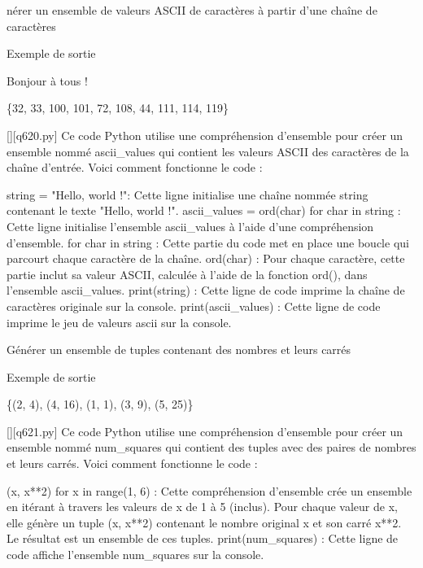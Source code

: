         \question
        nérer un ensemble de valeurs ASCII de caractères à partir d'une chaîne de caractères

Exemple de sortie

Bonjour à tous !

\{32, 33, 100, 101, 72, 108, 44, 111, 114, 119\}
        \par
        \begin{solution}
            \renewcommand{\nomfichier}{q620.py}
            \pythonfile{\chemincode \nomfichier}[][\nomfichier]
            Ce code Python utilise une compréhension d'ensemble pour créer un ensemble nommé ascii_values qui contient les valeurs ASCII des caractères de la chaîne d'entrée. Voici comment fonctionne le code :

    string = "Hello, world !": Cette ligne initialise une chaîne nommée string contenant le texte "Hello, world !".
    ascii_values = {ord(char) for char in string} : Cette ligne initialise l'ensemble ascii_values à l'aide d'une compréhension d'ensemble.
        for char in string : Cette partie du code met en place une boucle qui parcourt chaque caractère de la chaîne.
        {ord(char)} : Pour chaque caractère, cette partie inclut sa valeur ASCII, calculée à l'aide de la fonction ord(), dans l'ensemble ascii_values.
    print(string) : Cette ligne de code imprime la chaîne de caractères originale sur la console.
    print(ascii_values) : Cette ligne de code imprime le jeu de valeurs ascii sur la console.
        \end{solution}
        

        \question
        Générer un ensemble de tuples contenant des nombres et leurs carrés

Exemple de sortie

\{(2, 4), (4, 16), (1, 1), (3, 9), (5, 25)\}
        \par
        \begin{solution}
            \renewcommand{\nomfichier}{q621.py}
            \pythonfile{\chemincode \nomfichier}[][\nomfichier]
            Ce code Python utilise une compréhension d'ensemble pour créer un ensemble nommé num_squares qui contient des tuples avec des paires de nombres et leurs carrés. Voici comment fonctionne le code :

    {(x, x**2) for x in range(1, 6)} : Cette compréhension d'ensemble crée un ensemble en itérant à travers les valeurs de x de 1 à 5 (inclus). Pour chaque valeur de x, elle génère un tuple (x, x**2) contenant le nombre original x et son carré x**2. Le résultat est un ensemble de ces tuples.
    print(num_squares) : Cette ligne de code affiche l'ensemble num_squares sur la console.
        \end{solution}
        

